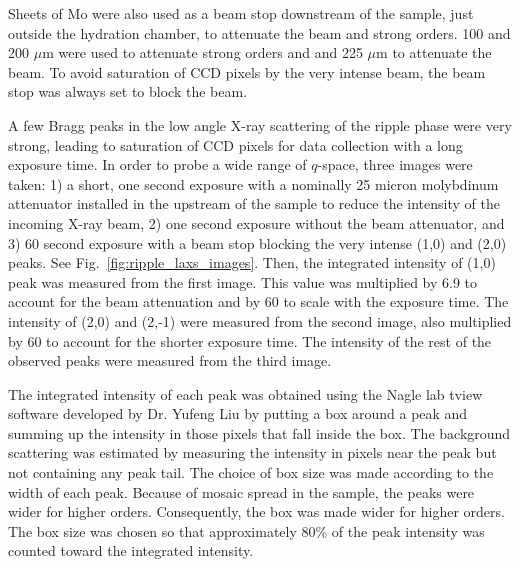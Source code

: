Sheets of Mo were also used as a beam stop downstream of the sample, just 
outside the hydration chamber, to attenuate the beam and strong orders.
100 and 200 $\mu$m were used to attenuate strong orders and 
and 225 $\mu$m to attenuate the beam. To avoid saturation of CCD pixels by
the very intense beam, the beam stop was always set to block the beam.

A few Bragg peaks in the low angle X-ray scattering of the ripple phase
were very strong, leading to saturation of CCD pixels for data collection
with a long exposure time. 
In order to probe a wide range of $q$-space, three images were taken:
1) a short, one second exposure with a nominally 25 micron 
molybdinum attenuator installed in the upstream of the sample to reduce the intensity
of the incoming X-ray beam, 2) one second exposure without the beam attenuator,
and 3) 60 second exposure with a beam stop blocking the very intense 
(1,0) and (2,0) peaks. See Fig.~\ref{fig:ripple_laxs_images}. 
Then, the integrated intensity of (1,0) peak was measured
from the first image. This value was multiplied by 6.9 to account for the beam
attenuation and by 60 to scale with the exposure time. 
The intensity of (2,0) and (2,-1) were measured from the second image, also
multiplied by 60 to account for the shorter exposure time. The intensity of
the rest of the observed peaks were measured from the third image.

The integrated intensity of each peak was obtained using the Nagle lab tview
software developed by Dr. Yufeng Liu \cite{Liu03} by putting a box around a
peak and summing up the intensity in those pixels that fall inside the box.
The background scattering was estimated by measuring the intensity in pixels
near the peak but not containing any peak tail. The choice of box size was 
made according to the width of each peak. Because of mosaic spread in the sample,
the peaks were wider for higher orders. 
Consequently, the box was made wider for higher
orders. The box size was chosen so that approximately 80\% of the peak intensity
was counted toward the integrated intensity.



